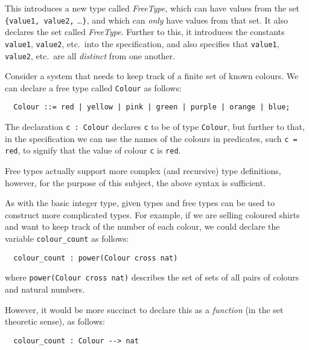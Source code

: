 This introduces a new type called \emph{FreeType}, which can have values from the set \texttt{\{value1, value2,} \ldots \texttt{\}}, and which can \emph{only} have values from that set. It also declares the set called \emph{FreeType}. Further to this, it introduces the constants \texttt{value1}, \texttt{value2}, etc.\ into the specification, and also specifies that \texttt{value1}, \texttt{value2}, etc.\ are all \emph{distinct} from one another.

\begin{example}
\label{ex:specification:colour-free-type}
Consider a system that needs to keep track of a finite set of known colours. We can declare a free type called \texttt{Colour} as follows:

\lstset{aboveskip=3mm}
\begin{lstlisting}
  Colour ::= red | yellow | pink | green | purple | orange | blue;
\end{lstlisting}

The declaration \texttt{c : Colour} declares \texttt{c} to be of type \texttt{Colour}, but further to that, in the specification we can use the names of the colours in predicates, such \texttt{c = red}, to signify that the value of colour \texttt{c} is \texttt{red}.

\end{example}

Free types actually support more complex (and recursive) type definitions, however, for the purpose of this subject, the above syntax is sufficient.

As with the basic integer type, given types and free types can be used to construct more complicated types. For example, if we are selling coloured shirts and want to keep track of the number of each colour, we could declare the variable \texttt{colour\_count} as follows:

\begin{lstlisting}
  colour_count : power(Colour cross nat)
\end{lstlisting}

where \texttt{power(Colour cross nat)} describes the set of sets of all pairs of colours and natural numbers.

However, it would be more succinct to declare this as a \emph{function} (in the set theoretic sense), as follows:

\begin{lstlisting}
  colour_count : Colour --> nat
\end{lstlisting}

